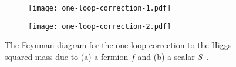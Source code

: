 \begin{figure}[htbp]
    \begin{center}
        \begin{subfigure}[b]{0.48\textwidth}
            \begin{center}
                \texttt{[image: one-loop-correction-1.pdf]}
                \caption{}
            \end{center}
        \end{subfigure}%
        \begin{subfigure}[b]{0.48\textwidth}
            \begin{center}
                \texttt{[image: one-loop-correction-2.pdf]}
                \caption{}
            \end{center}
        \end{subfigure}
    \end{center}
    \caption{The Feynman diagram for the one loop correction to the Higgs squared mass due to (a) a fermion $f$ and (b) a scalar $S$~\cite{Martin:1997ns}.}
    \label{fig:susy_one_loop_corrections}
\end{figure}

